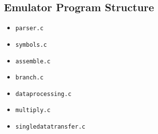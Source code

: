 \documentclass[8pt]{article}
\begin{document}
\begin{minipage}{0.45\textwidth}
\subsection{Emulator Program Structure}

\begin{itemize}
    \item \texttt{parser.c} 
    \item \texttt{symbols.c}
    \item \texttt{assemble.c}
    \item \texttt{branch.c}
    \item \texttt{dataprocessing.c}
    \item \texttt{multiply.c}
    \item \texttt{singledatatransfer.c}
\end{itemize}
\end{minipage}%
\hfill
\end{document}
